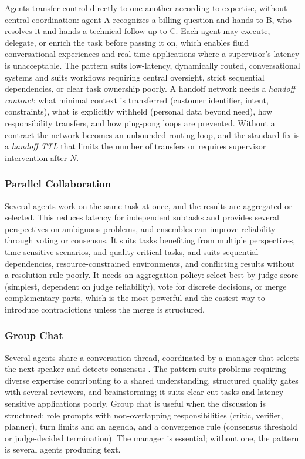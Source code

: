 \documentclass[11pt]{book}
\begin{document}
Agents transfer control directly to one another according to expertise, without central coordination: agent A recognizes a billing question and hands to B, who resolves it and hands a technical follow-up to C. Each agent may execute, delegate, or enrich the task before passing it on, which enables fluid conversational experiences and real-time applications where a supervisor's latency is unacceptable. The pattern suits low-latency, dynamically routed, conversational systems and suits workflows requiring central oversight, strict sequential dependencies, or clear task ownership poorly. A handoff network needs a \textit{handoff contract}: what minimal context is transferred (customer identifier, intent, constraints), what is explicitly withheld (personal data beyond need), how responsibility transfers, and how ping-pong loops are prevented. Without a contract the network becomes an unbounded routing loop, and the standard fix is a \textit{handoff TTL} that limits the number of transfers or requires supervisor intervention after $N$.

\subsubsection{Parallel Collaboration}

Several agents work on the same task at once, and the results are aggregated or selected. This reduces latency for independent subtasks and provides several perspectives on ambiguous problems, and ensembles can improve reliability through voting or consensus. It suits tasks benefiting from multiple perspectives, time-sensitive scenarios, and quality-critical tasks, and suits sequential dependencies, resource-constrained environments, and conflicting results without a resolution rule poorly. It needs an aggregation policy: select-best by judge score (simplest, dependent on judge reliability), vote for discrete decisions, or merge complementary parts, which is the most powerful and the easiest way to introduce contradictions unless the merge is structured.

\subsubsection{Group Chat}

Several agents share a conversation thread, coordinated by a manager that selects the next speaker and detects consensus \cite{msagentpatterns2025}. The pattern suits problems requiring diverse expertise contributing to a shared understanding, structured quality gates with several reviewers, and brainstorming; it suits clear-cut tasks and latency-sensitive applications poorly. Group chat is useful when the discussion is structured: role prompts with non-overlapping responsibilities (critic, verifier, planner), turn limits and an agenda, and a convergence rule (consensus threshold or judge-decided termination). The manager is essential; without one, the pattern is several agents producing text.
\end{document}

